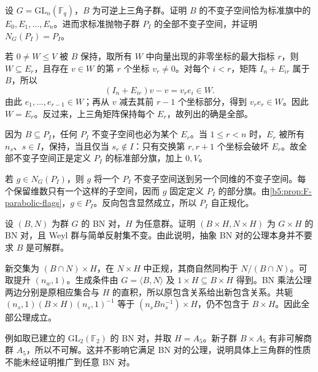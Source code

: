 \begin{exercise}\label{b5:ex:F-parabolic-normalizer}
	设 \(G=\mathrm{GL}_n(\mathbb F_q)\)，\(B\) 为可逆上三角子群。证明 \(B\) 的不变子空间恰为标准旗中的 \(E_0,E_1,\ldots,E_n\)。进而求标准抛物子群 \(P_I\) 的全部不变子空间，并证明 \(N_G(P_I)=P_I\)。
\end{exercise}
\begin{solution}
	若 \(0\ne W\le V\) 被 \(B\) 保持，取所有 \(W\) 中向量出现的非零坐标的最大指标 \(r\)，则 \(W\subseteq E_r\)，且存在 \(v\in W\) 的第 \(r\) 个坐标 \(v_r\ne0\)。对每个 \(i<r\)，矩阵 \(I_n+E_{ir}\) 属于 \(B\)，所以
	\[
		(I_n+E_{ir})v-v=v_r e_i\in W.
	\]
	由此 \(e_1,\ldots,e_{r-1}\in W\)；再从 \(v\) 减去其前 \(r-1\) 个坐标部分，得到 \(v_r e_r\in W\)。因此 \(W=E_r\)。反过来，上三角矩阵保持每个 \(E_r\)，故列出的确是全部。

	因为 \(B\subseteq P_I\)，任何 \(P_I\) 不变子空间也必为某个 \(E_r\)。当 \(1\le r<n\) 时，\(E_r\) 被所有 \(n_s\)、\(s\in I\)，保持，当且仅当 \(s_r\notin I\)：只有交换第 \(r,r+1\) 个坐标会破坏 \(E_r\)。故全部不变子空间正是定义 \(P_I\) 的标准部分旗，加上 \(0,V\)。

	若 \(g\in N_G(P_I)\)，则 \(g\) 将一个 \(P_I\) 不变子空间送到另一个同维的不变子空间。每个保留维数只有一个这样的子空间，因而 \(g\) 固定定义 \(P_I\) 的部分旗。由\cref{b5:prop:F-parabolic-flags}，\(g\in P_I\)。反向包含显然成立，所以 \(P_I\) 自正规化。
\end{solution}

\begin{exercise}\label{b5:ex:F-BN-product}
	设 \((B,N)\) 为群 \(G\) 的 BN 对，\(H\) 为任意群。证明 \((B\times H,N\times H)\) 为 \(G\times H\) 的 BN 对，且 Weyl 群与简单反射集不变。由此说明，抽象 BN 对的公理本身并不要求 \(B\) 是可解群。
\end{exercise}
\begin{solution}
	新交集为 \((B\cap N)\times H\)，在 \(N\times H\) 中正规，其商自然同构于 \(N/(B\cap N)\)。可取提升 \((n_w,1)\)。生成条件由 \(G=\langle B,N\rangle\) 及 \(1\times H\subseteq B\times H\) 得到。BN 乘法公理两边分别是原相应集合与 \(H\) 的直积，所以原包含关系给出新包含关系。共轭 \((n_s,1)(B\times H)(n_s,1)^{-1}\) 等于 \((n_sBn_s^{-1})\times H\)，仍不包含于 \(B\times H\)。因此全部公理成立。

	例如取已建立的 \(\mathrm{GL}_2(\mathbb F_2)\) 的 BN 对，并取 \(H=A_5\)。新子群 \(B\times A_5\) 有非可解商群 \(A_5\)，所以不可解。这并不影响它满足 BN 对的公理，说明具体上三角群的性质不能未经证明推广到任意 BN 对。
\end{solution}

